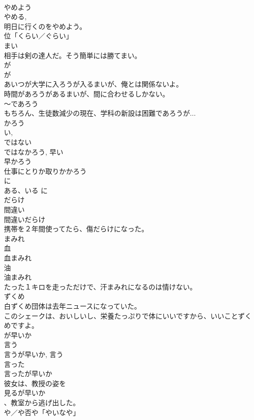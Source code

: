\documentclass[8pt]{extreport}
\begin{document}
\begin{CJK}{UTF8}{min}
\\	やめよう	
\\	やめる, 
\\	明日に行くのをやめよう。
\\	位「くらい／ぐらい」 
\\	まい	
\\	相手は剣の達人だ。そう簡単には勝てまい。
\\	が 
\\	が	
\\	あいつが大学に入ろうが入るまいが、俺とは関係ないよ。
\\	時間があろうがあるまいが、間に合わせるしかない。
\\	～であろう	
\\	もちろん、生徒数減少の現在、学科の新設は困難であろうが...
\\	かろう 
\\	い, 
\\	ではない 
\\	ではなかろう, 早い 
\\	早かろう 
\\	仕事にとりか取りかかろう
\\	に 
\\	ある、いる	に 
\\	だらけ	
\\	間違い 
\\	間違いだらけ 
\\	携帯を２年間使ってたら、傷だらけになった。
\\	まみれ	
\\	血 
\\	血まみれ 
\\	油 
\\	油まみれ 
\\	たった１キロを走っただけで、汗まみれになるのは情けない。
\\	ずくめ	
\\	白ずくめ団体は去年ニュースになっていた。
\\	このシェークは、おいしいし、栄養たっぷりで体にいいですから、いいことずくめですよ。
\\	が早いか	
\\	言う 
\\	言うが早いか, 言う 
\\	言った 
\\	言ったが早いか
\\	彼女は、教授の姿を
\\	見るが早いか
\\	、教室から逃げ出した。
\\	や／や否や「やいなや」	

\end{CJK}
\end{document}
